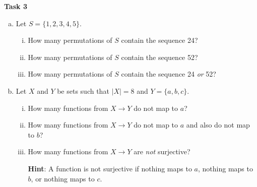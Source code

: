 \documentclass[12pt,letterpaper]{article}
\newcommand\hint[1]{\textbf{Hint}: #1}
\newenvironment{22enumerate}{\begin{enumerate}[a.]\itemsep0em}{\end{enumerate}}
\newif\ifsol
\newcommand{\solu}[2]{ \begin{mdframed} \ifsol #2 \else \vspace{#1} \fi \end{mdframed} }
\begin{document}
\textbf{Task 3}
\begin{22enumerate}
    \item Let $S=\{1, 2, 3, 4, 5\}$.
    \begin{enumerate}[i.]
        \item How many permutations of $S$ contain the sequence 24?
        \solu{2cm}{Treat 24 as a single units, so we're left with permuting \{1, 3, 5, 24\}. There are 4! permutations.}
        \item How many permutations of $S$ contain the sequence 52?
        \solu{1cm}{Same as above, 4!.}
        \item How many permutations of $S$ contain the sequence 24 \textit{or} 52?
        \solu{2cm}{Let $A$ be the set of permutations where $24$ appears and $B$ be the set of permutations where $52$ appears. $A \cap B$ will be the set of permutations where $524$ appears. If we treat this as a unit, we permute 3 elements, $|A \cap B| = 3!$. Thus, $|A \cup B| = |A| + |B| - |A \cap B| = 4! + 4! - 3!=42$.}
    \end{enumerate}
    \item Let $X$ and $Y$ be sets such that $|X| = 8$ and $Y = \{a, b, c\}$.
    \begin{enumerate}[i.]
        \item How many functions from $X \rightarrow Y$ do not map to $a$?
        \solu{1cm}{Each of the 8 elements in $X$ have two options of where to map to: $b$ or $c$. So, it's $2^8=256$.}
        \item How many functions from $X \rightarrow Y$ do not map to $a$ and also do not map to $b$? 
        \solu{1cm}{There's only 1 option, so it's $1^8=1$.}
        \item How many functions from $X \rightarrow Y$ are \textit{not} surjective?
        
        \hint{A function is not surjective if nothing maps to $a$, nothing maps to $b$, or nothing maps to $c$.}
        \solu{4cm}{Let the set of functions not mapping to $a$ be $A$, not mapping to $b$ be $B$, and not mapping to $c$ be $C$. \\
        $|A|=|B|=|C|=2^8$, as established above, since the argument for $i$ can be made to all three sets. \\
        $|A \cap B| = |B \cap C| = |A \cap C| = 1$, as the argument for ii can also be generalized. \\
        $A \cap B \cap C$ is functions from $X$ to $\{\}$, which is no functions. \\
        The total number of non-surjective functions is $|A \cup B \cup C| = 3 * 2^8 - 3 * 1 + 0=765$.} 
    \end{enumerate}
    
    
    
\end{22enumerate}
\end{document}
